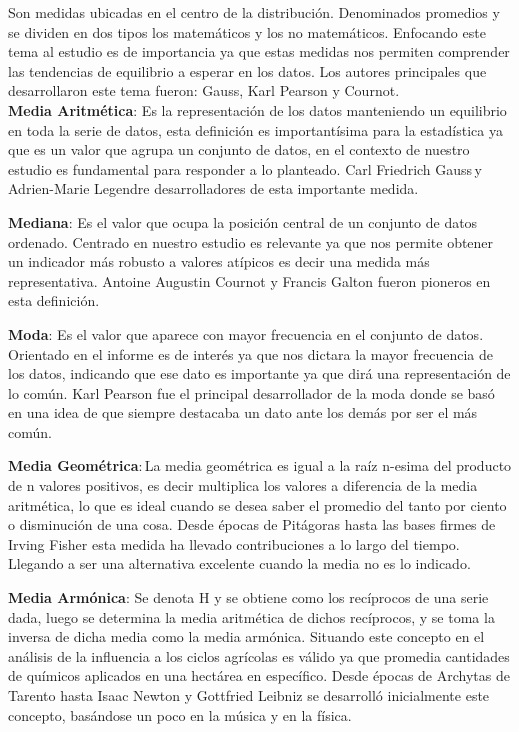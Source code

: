 \documentclass[oneside,11pt]{Latex/Classes/PhDthesisPSnPDF}
\begin{document}
Son medidas ubicadas en el centro de la distribución. Denominados
promedios y se dividen en dos tipos los matemáticos y los no
matemáticos. Enfocando este tema al estudio es de importancia ya que
estas medidas nos permiten comprender las tendencias de equilibrio a
esperar en los datos. Los autores principales que desarrollaron este
tema fueron: Gauss, Karl Pearson y Cournot.\\

\textbf{Media Aritmética}: Es la representación de los datos manteniendo
un equilibrio en toda la serie de datos, esta definición es
importantísima para la estadística ya que es un valor que agrupa un
conjunto de datos, en el contexto de nuestro estudio es fundamental para
responder a lo planteado. Carl Friedrich Gauss\,y\,Adrien-Marie Legendre
desarrolladores de esta importante medida.

\textbf{Mediana}: Es el valor que ocupa la posición central de un
conjunto de datos ordenado. Centrado en nuestro estudio es relevante ya
que nos permite obtener un indicador más robusto a valores atípicos es
decir una medida más representativa. Antoine Augustin Cournot y Francis
Galton fueron pioneros en esta definición.

\textbf{Moda}: Es el valor que aparece con mayor frecuencia en el
conjunto de datos. Orientado en el informe es de interés ya que nos
dictara la mayor frecuencia de los datos, indicando que ese dato es
importante ya que dirá una representación de lo común. Karl Pearson fue
el principal desarrollador de la moda donde se basó en una idea de que
siempre destacaba un dato ante los demás por ser el más común.

\textbf{Media Geométrica}:\,La media geométrica es igual a la raíz
n-esima del producto de n valores positivos, es decir multiplica los
valores a diferencia de la media aritmética, lo que es ideal cuando se
desea saber el promedio del tanto por ciento o disminución de una cosa.
Desde épocas de Pitágoras hasta las bases firmes de Irving Fisher esta
medida ha llevado contribuciones a lo largo del tiempo. Llegando a ser
una alternativa excelente cuando la media no es lo indicado.

\textbf{Media Armónica}: Se denota H y se obtiene como los recíprocos de
una serie dada, luego se determina la media aritmética de dichos
recíprocos, y se toma la inversa de dicha media como la media armónica.
Situando este concepto en el análisis de la influencia a los ciclos
agrícolas es válido ya que promedia cantidades de químicos aplicados en
una hectárea en específico. Desde épocas de Archytas de Tarento hasta
Isaac Newton y Gottfried Leibniz se desarrolló inicialmente este
concepto, basándose un poco en la música y en la física.
\end{document}
